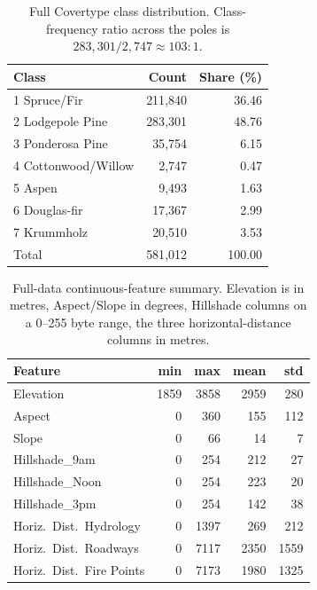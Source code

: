 \documentclass[11pt]{article}
\begin{document}
\begin{table}[h]\centering
\caption{Full Covertype class distribution. Class-frequency ratio across
the poles is $283{,}301 / 2{,}747 \approx 103{:}1$.}
\begin{tabularx}{0.85\linewidth}{Xrr}
\toprule
\textcolor{denimdark}{\textbf{Class}} & \textbf{Count} & \textbf{Share (\%)} \\
\midrule
1 Spruce/Fir          & 211{,}840 & 36.46 \\
2 Lodgepole Pine      & 283{,}301 & 48.76 \\
3 Ponderosa Pine      &  35{,}754 &  6.15 \\
4 Cottonwood/Willow   &   2{,}747 &  0.47 \\
5 Aspen               &   9{,}493 &  1.63 \\
6 Douglas-fir         &  17{,}367 &  2.99 \\
7 Krummholz           &  20{,}510 &  3.53 \\
\midrule
Total                 & 581{,}012 & 100.00 \\
\bottomrule
\end{tabularx}
\end{table}

\begin{table}[h]\centering
\caption{Full-data continuous-feature summary. Elevation is in metres,
Aspect/Slope in degrees, Hillshade columns on a 0--255 byte range, the three
horizontal-distance columns in metres.}
\begin{tabularx}{0.95\linewidth}{Xrrrr}
\toprule
\textcolor{denimdark}{\textbf{Feature}} & \textbf{min} & \textbf{max} & \textbf{mean} & \textbf{std} \\
\midrule
Elevation                   & 1859 & 3858 & 2959 & 280 \\
Aspect                      &    0 &  360 &  155 & 112 \\
Slope                       &    0 &   66 &   14 &   7 \\
Hillshade\_9am              &    0 &  254 &  212 &  27 \\
Hillshade\_Noon             &    0 &  254 &  223 &  20 \\
Hillshade\_3pm              &    0 &  254 &  142 &  38 \\
Horiz.\ Dist.\ Hydrology    &    0 & 1397 &  269 & 212 \\
Horiz.\ Dist.\ Roadways     &    0 & 7117 & 2350 & 1559 \\
Horiz.\ Dist.\ Fire Points  &    0 & 7173 & 1980 & 1325 \\
\bottomrule
\end{tabularx}
\end{table}
\end{document}

